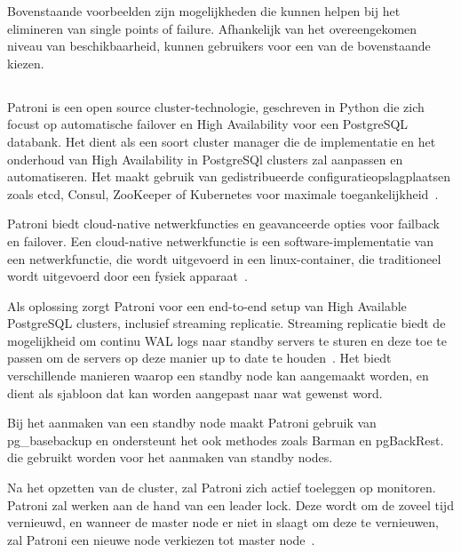Bovenstaande voorbeelden zijn mogelijkheden die kunnen helpen bij het elimineren van single points of failure. Afhankelijk van het overeengekomen niveau van beschikbaarheid, kunnen gebruikers voor een van de bovenstaande kiezen.




\subsection{}
\label{subsec:Patroni}


Patroni is een open source cluster-technologie, geschreven in Python die zich focust op automatische failover en High Availability voor een PostgreSQL databank. Het dient als een soort cluster manager die de implementatie en het onderhoud van High Availability in PostgreSQl clusters zal aanpassen en automatiseren. Het maakt gebruik van gedistribueerde configuratieopslagplaatsen zoals etcd, Consul, ZooKeeper of Kubernetes voor maximale toegankelijkheid~\autocite{Markwort2018}.


Patroni biedt cloud-native netwerkfuncties en geavanceerde opties voor failback en failover. Een cloud-native netwerkfunctie is een software-implementatie van een netwerkfunctie, die wordt uitgevoerd in een linux-container, die traditioneel wordt uitgevoerd door een fysiek apparaat~\autocite{CDNF2020}.

Als oplossing zorgt Patroni voor een end-to-end setup van High Available PostgreSQL clusters, inclusief streaming replicatie. Streaming replicatie biedt de mogelijkheid om continu WAL logs naar standby servers te sturen en deze toe te passen om de servers op deze manier up to date te houden~\autocite{2020}. %
Het biedt verschillende manieren waarop een standby node kan aangemaakt worden, en dient als sjabloon dat kan worden aangepast naar wat gewenst word.

Bij het aanmaken van een standby node maakt Patroni gebruik van pg\_basebackup en ondersteunt het ook methodes zoals Barman en pgBackRest. die gebruikt worden voor het aanmaken van standby nodes.

Na het opzetten van de cluster, zal Patroni zich actief toeleggen op monitoren. Patroni zal werken aan de hand van een leader lock. Deze wordt om de zoveel tijd vernieuwd, en wanneer de master node er niet in slaagt om deze te vernieuwen, zal Patroni een nieuwe node verkiezen tot master node~\autocite{ScaleGrid2018}. %

